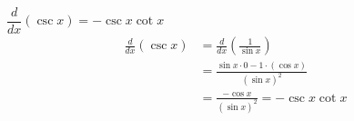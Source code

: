 {$\dfrac{d}{dx}(\csc x) = -\csc x \cot x$}
{\begin{align*}
\frac{d}{dx}(\csc x)
&=\frac{d}{dx}\left(\frac{1}{\sin x}\right)\\
&=\frac{\sin x \cdot 0 - 1 \cdot (\cos x)}{(\sin x)^2}\\
&=\frac{-\cos x}{(\sin x)^2} = -\csc x \cot x
\end{align*}}
